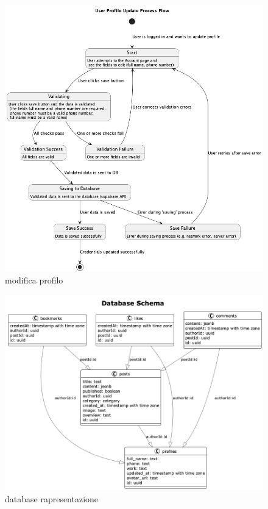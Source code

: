 \documentclass{article}
\begin{document}
\begin{figure}[h]
    \lefting
    \includegraphics[width=1.3\textwidth]{modifica_profilo_flow}
    \caption{modifica profilo}
\end{figure}

\begin{figure}[h]
    \lefting
    \includegraphics[width=1.3\textwidth]{database}
    \caption{database rapresentazione}
\end{figure}
\end{document}
